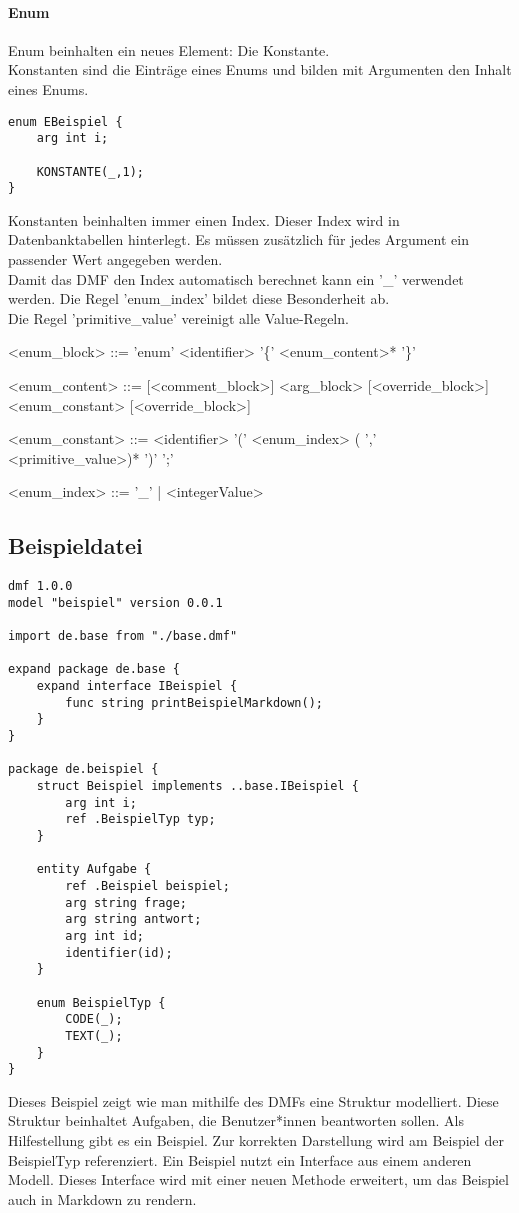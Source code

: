 \documentclass[./einleitung.tex]{subfiles}
\begin{document}
\paragraph{Enum}
Enum beinhalten ein neues Element: Die Konstante. \\
Konstanten sind die Einträge eines Enums und bilden mit Argumenten den Inhalt eines Enums.
\begin{lstlisting}
enum EBeispiel {
    arg int i;
    
    KONSTANTE(_,1);
}
\end{lstlisting}
Konstanten beinhalten immer einen Index. Dieser Index wird in Datenbanktabellen hinterlegt. Es müssen zusätzlich für jedes Argument ein passender Wert angegeben werden. \\
Damit das DMF den Index automatisch berechnet kann ein '_' verwendet werden. Die Regel 'enum_index' bildet diese Besonderheit ab. \\
Die Regel 'primitive_value' vereinigt alle Value-Regeln.
\begin{grammar}
<enum_block> ::= 'enum' <identifier> '\{' <enum_content>* '\}'

<enum_content> ::= [<comment_block>] <arg_block> [<override_block>]
 <enum_constant> [<override_block>]

<enum_constant> ::= <identifier> '(' <enum_index> ( ',' <primitive_value>)* ')' ';'

<enum_index> ::= '_' | <integerValue>
\end{grammar}

\subsection{Beispieldatei}
\begin{lstlisting}
dmf 1.0.0
model "beispiel" version 0.0.1

import de.base from "./base.dmf"

expand package de.base {
    expand interface IBeispiel {
        func string printBeispielMarkdown();
    }
}

package de.beispiel {
    struct Beispiel implements ..base.IBeispiel {
        arg int i;
        ref .BeispielTyp typ;
    }
    
    entity Aufgabe {
        ref .Beispiel beispiel;
        arg string frage;
        arg string antwort;
        arg int id;
        identifier(id);
    }
    
    enum BeispielTyp {
        CODE(_);
        TEXT(_);
    }
}
\end{lstlisting}
Dieses Beispiel zeigt wie man mithilfe des DMFs eine Struktur modelliert. Diese Struktur beinhaltet Aufgaben, die Benutzer*innen beantworten sollen. Als Hilfestellung gibt es ein Beispiel. Zur korrekten Darstellung wird am Beispiel der BeispielTyp referenziert. Ein Beispiel nutzt ein Interface aus einem anderen Modell. Dieses Interface wird mit einer neuen Methode erweitert, um das Beispiel auch in Markdown zu rendern.

\end{document}
